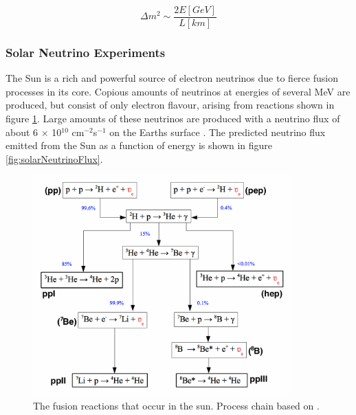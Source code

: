 \begin{equation}
	\Delta m^{2} \sim \frac{2E [GeV]}{L [km]}
	\label{eq:nuMassSensitivity}
\end{equation}

\subsubsection{Solar Neutrino Experiments}
The Sun is a rich and powerful source of electron neutrinos due to fierce fusion processes in its core. Copious amounts of neutrinos at energies of several MeV are produced, but consist of only electron flavour, arising from reactions shown in figure \ref{fig:solarNeutrinoChain}. Large amounts of these neutrinos are produced with a neutrino flux of about 6 $\times$ 10$^{10}$ cm$^{-2}$s$^{-1}$ on the Earths surface \cite{giuntiNeutrino}. The predicted neutrino flux emitted from the Sun as a function of energy is shown in figure \ref{fig:solarNeutrinoFlux}.
\begin{figure}[htbp]
\begin{center}
\includegraphics[width=100mm]{Introduction/IntroductionFigs/solarNeutrinoChain.png}
\caption{The fusion reactions that occur in the sun. Process chain based on \cite{giuntiNeutrino}.}
\label{fig:solarNeutrinoChain}
\end{center}
\end{figure}

